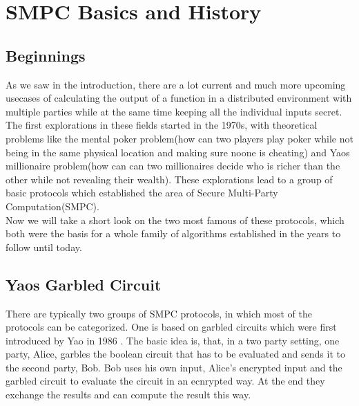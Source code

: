 \documentclass[english,runningheads,a4paper]{llncs}[2018/03/10]
\begin{document}
\section{SMPC Basics and History}\label{sec:smpc}
\subsection{Beginnings}
As we saw in the introduction, there are a lot current and much more upcoming usecases of calculating the output of a function in a distributed environment with multiple parties while at the same time keeping all the individual inputs secret. The first explorations in these fields started in the 1970s, with theoretical problems like the mental poker problem(how can two players play poker while not being in the same physical location and making sure noone is cheating) and Yaos millionaire problem(how can can two millionaires decide who is richer than the other while not revealing their wealth). \newline
These explorations lead to a group of basic protocols which established the area of Secure Multi-Party Computation(SMPC).\\
 Now we will take a short look on the two most famous of these protocols, which both were the basis for a whole family of algorithms established in the years to follow until today.

\subsection{Yaos Garbled Circuit}
There are typically two groups of SMPC protocols, in which most of the protocols can be categorized. One is based on garbled circuits which were first introduced by Yao in 1986 \cite{4568207}. The basic idea is, that, in a two party setting, one party, Alice, garbles the boolean circuit that has to be evaluated and sends it to the second party, Bob. Bob uses his own input, Alice's encrypted input and the garbled circuit to evaluate the circuit in an ecnrypted way. At the end they exchange the results and can compute the result this way. 
\end{document}
